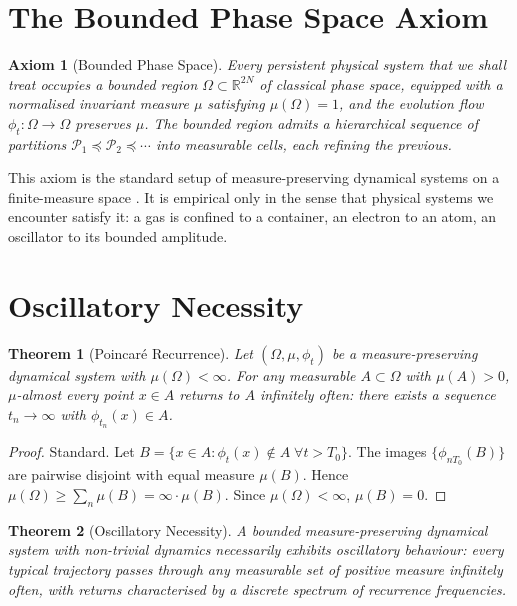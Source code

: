 \documentclass[11pt,a4paper]{article}
\theoremstyle{thmstyle}
\newtheorem{theorem}{Theorem}[section]
\theoremstyle{axiomstyle}
\newtheorem{axiom}{Axiom}
\theoremstyle{definition}
\theoremstyle{remark}
\newcommand{\Real}{\mathbb{R}}
\newcommand{\Pspace}{\mathcal{P}}
\begin{document}
\section{The Bounded Phase Space Axiom}
\label{sec:foundations}

\begin{axiom}[Bounded Phase Space]\label{ax:bps}
Every persistent physical system that we shall treat occupies a bounded region $\Omega\subset\Real^{2N}$ of classical phase space, equipped with a normalised invariant measure $\mu$ satisfying $\mu(\Omega)=1$, and the evolution flow $\phi_{t}:\Omega\to\Omega$ preserves $\mu$. The bounded region admits a hierarchical sequence of partitions $\Pspace_{1}\preceq\Pspace_{2}\preceq\cdots$ into measurable cells, each refining the previous.
\end{axiom}

This axiom is the standard setup of measure-preserving dynamical systems on a finite-measure space \citep{walters1982}. It is empirical only in the sense that physical systems we encounter satisfy it: a gas is confined to a container, an electron to an atom, an oscillator to its bounded amplitude.

\section{Oscillatory Necessity}
\label{sec:oscnec}

\begin{theorem}[Poincar\'e Recurrence]\label{thm:poincare}
Let $(\Omega,\mu,\phi_{t})$ be a measure-preserving dynamical system with $\mu(\Omega)<\infty$. For any measurable $A\subset\Omega$ with $\mu(A)>0$, $\mu$-almost every point $x\in A$ returns to $A$ infinitely often: there exists a sequence $t_{n}\to\infty$ with $\phi_{t_{n}}(x)\in A$.
\end{theorem}

\begin{proof}
Standard. Let $B=\{x\in A:\phi_{t}(x)\notin A\;\forall t>T_{0}\}$. The images $\{\phi_{nT_{0}}(B)\}$ are pairwise disjoint with equal measure $\mu(B)$. Hence $\mu(\Omega)\geq\sum_{n}\mu(B)=\infty\cdot\mu(B)$. Since $\mu(\Omega)<\infty$, $\mu(B)=0$.
\end{proof}

\begin{theorem}[Oscillatory Necessity]\label{thm:oscnec}
A bounded measure-preserving dynamical system with non-trivial dynamics necessarily exhibits oscillatory behaviour: every typical trajectory passes through any measurable set of positive measure infinitely often, with returns characterised by a discrete spectrum of recurrence frequencies.
\end{theorem}
\end{document}
